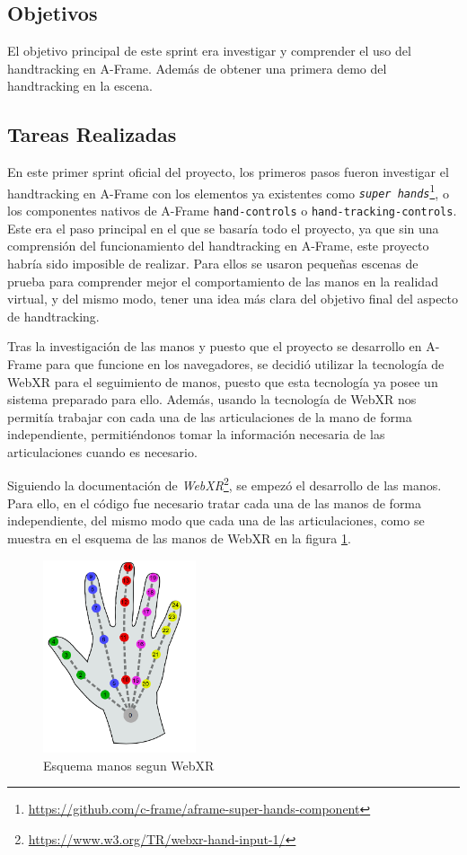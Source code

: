 \documentclass[a4paper, 12pt]{book}
\begin{document}
\subsection{Objetivos}
\label{subsec:objetivo-principal1}
El objetivo principal de este sprint era investigar y comprender el uso del handtracking en A-Frame. 
Además de obtener una primera demo del handtracking en la escena.

\subsection{Tareas Realizadas}
\label{subsec:implementacion1}
En este primer sprint oficial del proyecto, los primeros pasos fueron investigar el handtracking en A-Frame con los elementos ya existentes como \textit{\texttt{super hands}}\footnote{\url{https://github.com/c-frame/aframe-super-hands-component}}, o los componentes nativos de A-Frame \texttt{hand-controls} o \texttt{hand-tracking-controls}. Este era el paso principal en el que se basaría todo el proyecto, ya que sin una comprensión del funcionamiento del handtracking en A-Frame, este proyecto habría sido imposible de realizar.
Para ellos se usaron pequeñas escenas de prueba para comprender mejor el comportamiento de las manos en la realidad virtual, y del mismo modo, tener una idea más clara del objetivo final del aspecto de handtracking. 

Tras la investigación de las manos y puesto que el proyecto se desarrollo en A-Frame para que funcione en los navegadores, se decidió utilizar la tecnología de WebXR para el seguimiento de manos, puesto que esta tecnología ya posee un sistema preparado para ello. Además, usando la tecnología de WebXR nos permitía trabajar con cada una de las articulaciones de la mano de forma independiente, permitiéndonos tomar la información necesaria de las articulaciones cuando es necesario. 

Siguiendo la documentación de \textit{WebXR}\footnote{\url{https://www.w3.org/TR/webxr-hand-input-1/}}, se empezó el desarrollo de las manos. Para ello, en el código fue necesario tratar cada una de las manos de forma independiente, del mismo modo que cada una de las articulaciones, como se muestra en el esquema de las manos de WebXR en la figura \ref{fig:WebXR-manos}. 

\begin{figure}[H] 
  \centering
  \includegraphics[width=0.4\textwidth]{img/webxr-mano.png} 
  \caption{Esquema manos segun WebXR}
  \label{fig:WebXR-manos}
\end{figure}
\end{document}
